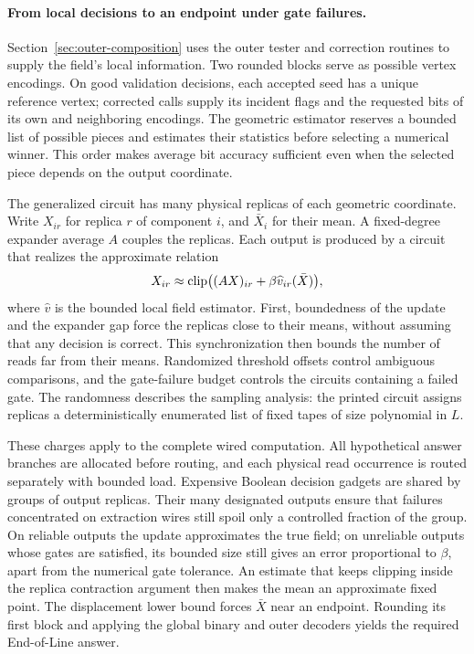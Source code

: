 \paragraph{From local decisions to an endpoint under gate failures.}
Section~\ref{sec:outer-composition} uses the outer tester and correction
routines to supply the field's local information. Two rounded blocks
serve as possible vertex encodings. On good validation decisions, each
accepted seed has a unique reference vertex; corrected calls supply its incident
flags and the requested bits of its own and neighboring encodings.
The geometric estimator reserves a bounded list of possible pieces and
estimates their statistics before selecting a numerical winner.
This order makes average bit accuracy sufficient even when the selected
piece depends on the output coordinate.

The generalized circuit has many physical replicas of each geometric
coordinate. Write $X_{ir}$ for replica $r$ of component $i$, and
$\bar X_i$ for their mean. A fixed-degree expander average $A$ couples
the replicas. Each output is produced by a circuit that realizes the
approximate relation
\[
 X_{ir}\approx\operatorname{clip}\bigl((AX)_{ir}
                       +\beta\widehat v_{ir}(\bar X)\bigr),
\]
where $\widehat v$ is the bounded local field estimator. First, boundedness
of the update and the expander gap force the replicas close to their
means, without assuming that any decision is correct. This synchronization
then bounds the number of reads far from their means. Randomized
threshold offsets control ambiguous comparisons, and the gate-failure
budget controls the circuits containing a failed gate.
The randomness describes the sampling analysis: the printed circuit assigns
replicas a deterministically enumerated list of fixed tapes of size polynomial
in $L$.

These charges apply to the complete wired computation. All hypothetical
answer branches are allocated before routing, and each physical read
occurrence is routed separately with bounded load. Expensive Boolean
decision gadgets are shared by groups of output replicas. Their many
designated outputs ensure that failures concentrated on extraction
wires still spoil only a controlled fraction of the group. On reliable
outputs the update approximates the true field; on unreliable outputs
whose gates are satisfied, its bounded size still gives an error
proportional to $\beta$, apart from the numerical gate tolerance. An estimate that keeps clipping inside the
replica contraction argument then makes the mean an approximate fixed
point. The displacement lower bound forces $\bar X$ near an endpoint.
Rounding its first block and applying the global binary and outer
decoders yields the required End-of-Line answer.


